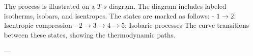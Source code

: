 The process is illustrated on a \( T \)-\( s \) diagram. The diagram includes labeled isotherms, isobars, and isentropes. The states are marked as follows:  
- \( 1 \to 2 \): Isentropic compression  
- \( 2 \to 3 \to 4 \to 5 \): Isobaric processes  
The curve transitions between these states, showing the thermodynamic paths.  

---